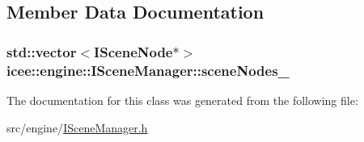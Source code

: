 \subsection{Member Data Documentation}
\hypertarget{classicee_1_1engine_1_1ISceneManager_abe2884dbf5f8bb733e4eabcc92922963}{
\subsubsection[{sceneNodes\_\-}]{\setlength{\rightskip}{0pt plus 5cm}std::vector$<${\bf ISceneNode}$\ast$$>$ {\bf icee::engine::ISceneManager::sceneNodes\_\-}}}
\label{classicee_1_1engine_1_1ISceneManager_abe2884dbf5f8bb733e4eabcc92922963}


The documentation for this class was generated from the following file:\begin{DoxyCompactItemize}
\item 
src/engine/\hyperlink{ISceneManager_8h}{ISceneManager.h}\end{DoxyCompactItemize}
